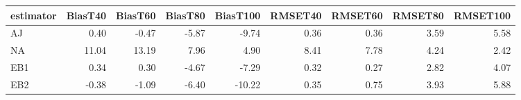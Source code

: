 \begin{table}[ht]
\centering
\begin{tabular}{lrrrrrrrr}
  \toprule
estimator & BiasT40 & BiasT60 & BiasT80 & BiasT100 & RMSET40 & RMSET60 & RMSET80 & RMSET100 \\ 
  \midrule
AJ & 0.40 & -0.47 & -5.87 & -9.74 & 0.36 & 0.36 & 3.59 & 5.58 \\ 
  NA & 11.04 & 13.19 & 7.96 & 4.90 & 8.41 & 7.78 & 4.24 & 2.42 \\ 
  EB1 & 0.34 & 0.30 & -4.67 & -7.29 & 0.32 & 0.27 & 2.82 & 4.07 \\ 
  EB2 & -0.38 & -1.09 & -6.40 & -10.22 & 0.35 & 0.75 & 3.93 & 5.88 \\ 
   \bottomrule
\end{tabular}
\end{table}

